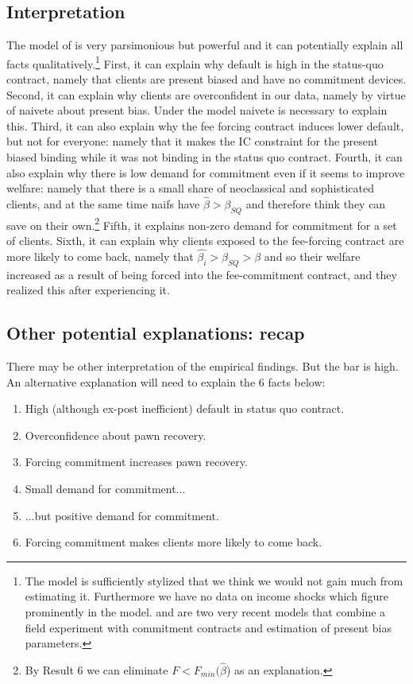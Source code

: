 \documentclass[oneside,11pt]{article}
\begin{document}
\subsection{Interpretation}

The model of \cite{John} is very parsimonious but powerful and it can potentially explain all facts qualitatively.\footnote{The model is sufficiently stylized that we think we would not gain much from estimating it. Furthermore we have no data on income shocks which figure prominently in the model. \cite{Ted} and \cite{Aprajit} are two very recent models that combine a field experiment with commitment contracts and estimation of present bias parameters.} First, it can explain why default is high in the status-quo contract, namely that clients are present biased and have no commitment devices. Second, it can explain why clients are overconfident in our data, namely by virtue of naivete about present bias. Under the model naivete is necessary to explain this. Third, it can also explain why the fee forcing contract induces lower default, but not for everyone: namely that it makes the IC constraint for the present biased binding while it was not binding in the status quo contract. Fourth, it can also explain why there is low demand for commitment even if it seems to improve welfare: namely that there is a small share of neoclassical and sophisticated clients, and at the same time naifs have  $\hat{\beta}>\beta_{SQ}$ and therefore think they can save on their own.\footnote{By Result 6 we can eliminate $F<F_{min}(\widehat{\beta}$) as an explanation.} Fifth, it explains non-zero demand for commitment for a set of clients. Sixth, it can explain why clients exposed to the fee-forcing contract are more likely to come back, namely that $\hat{\beta_i}>\beta_{SQ}>\beta$ and so their welfare increased as a result of being forced into the fee-commitment contract, and they realized this after experiencing it.




\subsection{Other potential explanations: recap} \label{explanations_recap}

There may be other interpretation of the empirical findings. But the bar is high. An alternative explanation will need to explain the 6 facts below:

\begin{enumerate}
\itemsep0em 
\item High (although ex-post inefficient) default in status quo contract.
\item Overconfidence about pawn recovery.
\item Forcing commitment increases pawn recovery.
\item Small demand for commitment...
\item ...but positive demand for commitment.
\item Forcing commitment makes clients more likely to come back.
\end{enumerate}
\end{document}
